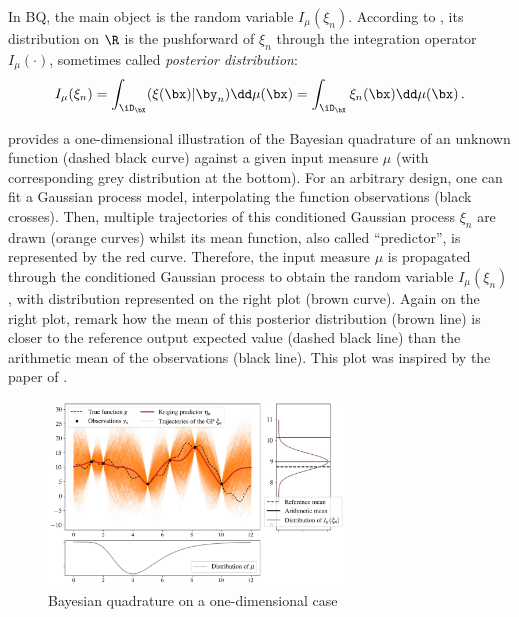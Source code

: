 In BQ, the main object is the random variable $I_{\mu}(\xi_n)$. 
According to \cite{briol_oates_2019}, its distribution on $\R$ is the pushforward of $\xi_n$ through the integration operator $I_\mu(\cdot)$, sometimes called \emph{posterior distribution}: 
\begin{equation}
    I_{\mu}(\xi_n) = \int_{\iD_\bX} (\xi(\bx) | \by_n)  \dd \mu(\bx) = \int_{\iD_\bX} \xi_n(\bx)  \dd \mu(\bx) \,.
\label{eq:posterior}
\end{equation}

 provides a one-dimensional illustration of the Bayesian quadrature of an unknown function (dashed black curve) against a given input measure $\mu$ (with corresponding grey distribution at the bottom). 
For an arbitrary design, one can fit a Gaussian process model, interpolating the function observations (black crosses). 
Then, multiple trajectories of this conditioned Gaussian process $\xi_n$ are drawn (orange curves) whilst its mean function, also called ``predictor'', is represented by the red curve. 
Therefore, the input measure $\mu$ is propagated through the conditioned Gaussian process to obtain the random variable $I_{\mu}(\xi_n)$, with distribution represented on the right plot (brown curve). 
Again on the right plot, remark how the mean of this posterior distribution (brown line) is closer to the reference output expected value (dashed black line) than the arithmetic mean of the observations (black line). 
This plot was inspired by the paper of \cite{husar_duvenaud_2012}.

\begin{figure}[!h]
\begin{center}
    \includegraphics[width=0.7\textwidth]{part2/figures/DCE/numerical_experiments/posterior_distribution_centered.jpg}
    \caption{Bayesian quadrature on a one-dimensional case}
    \label{fig:bayesian_quad}
\end{center}
\end{figure}

